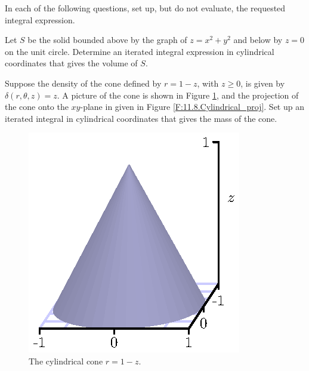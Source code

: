 \begin{activity} \label{A:11.8.3} In each of the following questions, set up, but do not evaluate, the requested integral expression.

\ba

	\item Let $S$ be the solid bounded above by the graph of $z = x^2+y^2$ and below by $z=0$ on the unit circle. Determine an iterated integral expression in cylindrical coordinates that gives the volume of $S$.

	\item Suppose the density of the cone defined by $r = 1 - z$, with $z \geq 0$, is given by $\delta(r, \theta, z) = z$. A picture of the cone is shown in Figure \ref{F:11.8.Cylindrical_ex}, and the projection of the cone onto the $xy$-plane in given in Figure \ref{F:11.8.Cylindrical_proj}. Set up an iterated integral in cylindrical coordinates that gives the mass of the cone.
\begin{figure}[ht]
\begin{center}
\begin{minipage}{2.5in}
\begin{center}
  \includegraphics{figures/fig_11_8_cone.eps}
\end{center}
\caption{The cylindrical cone $r = 1-z$.}
\label{F:11.8.Cylindrical_ex}
\end{minipage} \hspace{0.5in}
\begin{minipage}{2.5in}
\begin{center}

\end{center}
\end{minipage}
\end{center}
\end{figure}
\end{activity}
